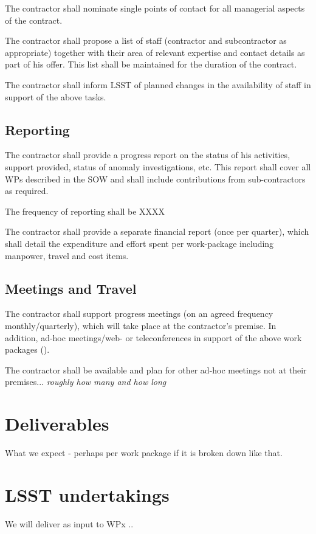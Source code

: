 \documentclass[DM,lsstdraft,SOW]{lsstdoc}
\begin{document}
         {      \label{req:mngt:spoc}
The contractor shall nominate single points of contact for all managerial aspects of the contract.
}


         {      \label{req:mngt:exp}
The contractor shall propose a list of staff (contractor and subcontractor as appropriate)
together with their area of relevant expertise and contact details as part of his offer. This list
shall be maintained for the duration of the contract.
 }

         {      \label{req:mngt:avail}
The contractor shall inform LSST  of planned changes in the availability of staff in
support of the above tasks.
 }

\subsection{Reporting}
         {      \label{req:mngt:rep}
The contractor shall provide a progress report on the status of his activities, support provided,
status of anomaly investigations, etc. This report shall cover all WPs described in the SOW
and shall include contributions from sub-contractors as required.
 }

         {      \label{req:mngt:repfreq}
The frequency of reporting shall be XXXX 
 }

         {      \label{req:mngt:repfin}
The contractor shall provide a separate financial report (once per quarter), which shall detail
the expenditure and effort spent per work-package including manpower, travel and cost items.
 }

\subsection{Meetings and Travel}
         {      \label{req:mngt:pm}
The contractor shall support progress meetings (on an agreed frequency monthly/quarterly), which will take
place at the contractor’s premise. In addition, ad-hoc meetings/web- or teleconferences in
support of the above work packages ().
}

         {      \label{req:mngt:pm}
The contractor shall be available and plan for other ad-hoc meetings  not at their premises... {\em roughly how many and how long }
}

\section{Deliverables}
What we expect - perhaps per work package if it is broken down like that.


\section{LSST undertakings}
We will deliver as input to WPx ..
\end{document}
